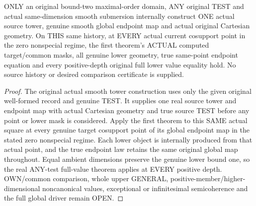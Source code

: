 \begin{theorem}
\label{hir:original-only-zero-common-curve-full-value-producer}
\leanok
ONLY an original bound-two maximal-order domain, ANY original TEST and
actual same-dimension smooth submersion internally construct ONE actual
source tower, genuine smooth global endpoint map and actual original
Cartesian geometry. On THIS same history, at EVERY actual current
cosupport point in the zero nonspecial regime, the first theorem's
ACTUAL computed target/common masks, all genuine lower geometry, true
same-point endpoint equation and every positive-depth original full
lower value equality hold. No source history or desired comparison
certificate is supplied.
\end{theorem}
\begin{proof}
The original actual smooth tower construction uses only the given
original well-formed record and genuine TEST. It supplies one real
source tower and endpoint map with actual Cartesian geometry and true
source TEST before any point or lower mask is considered. Apply the
first theorem to this SAME actual square at every genuine target
cosupport point of its global endpoint map in the stated zero
nonspecial regime. Each lower object is internally produced from that
actual point, and the true endpoint law retains the same original
global map throughout. Equal ambient dimensions preserve the genuine
lower bound one, so the real ANY-test full-value theorem applies at
EVERY positive depth. OWN/common comparison, whole upper GENERAL,
positive-member/higher-dimensional noncanonical values, exceptional or
infinitesimal semicoherence and the full global driver remain OPEN.
\end{proof}
